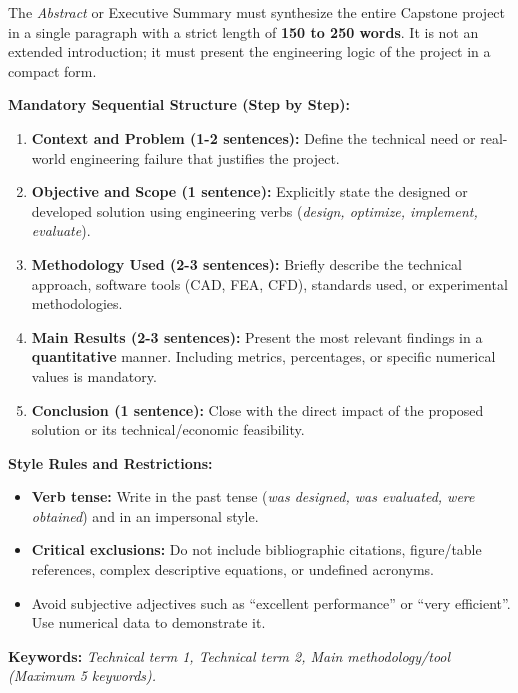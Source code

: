 \documentclass[12pt,letterpaper]{report}
\begin{document}
\begin{abstractpg}
\begin{instruccionesabstract}
The \textsl{Abstract} or Executive Summary must synthesize the entire Capstone project in a single paragraph with a strict length of \textbf{150 to 250 words}. It is not an extended introduction; it must present the engineering logic of the project in a compact form.

\vspace{2mm}
\noindent \textbf{Mandatory Sequential Structure (Step by Step):}
\begin{enumerate}
  \item \textbf{Context and Problem (1-2 sentences):} Define the technical need or real-world engineering failure that justifies the project.
  \item \textbf{Objective and Scope (1 sentence):} Explicitly state the designed or developed solution using engineering verbs (\textsl{design, optimize, implement, evaluate}).
  \item \textbf{Methodology Used (2-3 sentences):} Briefly describe the technical approach, software tools (CAD, FEA, CFD), standards used, or experimental methodologies.
  \item \textbf{Main Results (2-3 sentences):} Present the most relevant findings in a \textbf{quantitative} manner. Including metrics, percentages, or specific numerical values is mandatory.
  \item \textbf{Conclusion (1 sentence):} Close with the direct impact of the proposed solution or its technical/economic feasibility.
\end{enumerate}

\vspace{2mm}
\noindent \textbf{Style Rules and Restrictions:}
\begin{itemize}
  \item \textbf{Verb tense:} Write in the past tense (\textsl{was designed, was evaluated, were obtained}) and in an impersonal style.
  \item \textbf{Critical exclusions:} Do not include bibliographic citations, figure/table references, complex descriptive equations, or undefined acronyms.
  \item Avoid subjective adjectives such as ``excellent performance'' or ``very efficient''. Use numerical data to demonstrate it.
\end{itemize}

\vspace{3mm}
\noindent \textbf{Keywords:} \textsl{Technical term 1, Technical term 2, Main methodology/tool (Maximum 5 keywords).}
\end{instruccionesabstract}
\end{abstractpg}
\end{document}
